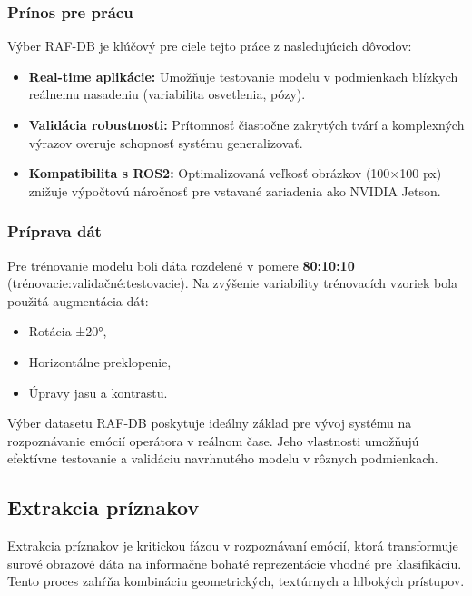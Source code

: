 \subsubsection{Prínos pre prácu}
Výber RAF-DB je kľúčový pre ciele tejto práce z nasledujúcich dôvodov:
\begin{itemize}
    \item \textbf{Real-time aplikácie:} Umožňuje testovanie modelu v podmienkach blízkych reálnemu nasadeniu (variabilita osvetlenia, pózy).
    \item \textbf{Validácia robustnosti:} Prítomnosť čiastočne zakrytých tvárí a komplexných výrazov overuje schopnosť systému generalizovať.
    \item \textbf{Kompatibilita s ROS2:} Optimalizovaná veľkosť obrázkov (100×100 px) znižuje výpočtovú náročnosť pre vstavané zariadenia ako NVIDIA Jetson.
\end{itemize}

\subsubsection{Príprava dát}
Pre trénovanie modelu boli dáta rozdelené v pomere \textbf{80:10:10} (trénovacie:validačné:testovacie). Na zvýšenie variability trénovacích vzoriek bola použitá augmentácia dát:
\begin{itemize}
    \item Rotácia ±20°,
    \item Horizontálne preklopenie,
    \item Úpravy jasu a kontrastu.
\end{itemize}

Výber datasetu RAF-DB poskytuje ideálny základ pre vývoj systému na rozpoznávanie emócií operátora v reálnom čase. Jeho vlastnosti umožňujú efektívne testovanie a validáciu navrhnutého modelu v rôznych podmienkach.

\subsection{Extrakcia príznakov}
Extrakcia príznakov je kritickou fázou v rozpoznávaní emócií, ktorá transformuje surové obrazové dáta na informačne bohaté reprezentácie vhodné pre klasifikáciu. Tento proces zahŕňa kombináciu geometrických, textúrnych a hlbokých prístupov.


